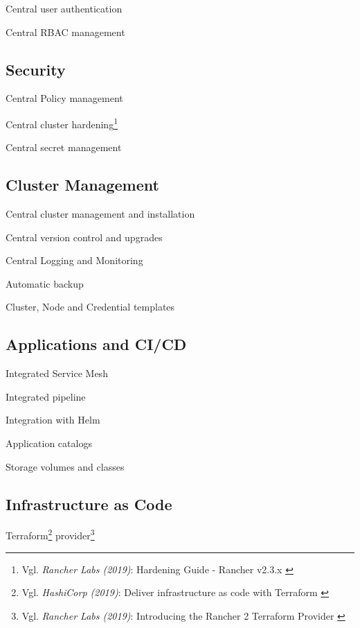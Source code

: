 Central user authentication

Central RBAC management

\subsection{Security}

Central Policy management

Central cluster hardening\footnote{Vgl. \textit{Rancher Labs (2019)}: Hardening Guide - Rancher v2.3.x \cite{hardeningGuide}}

Central secret management

\subsection{Cluster Management}

Central cluster management and installation

Central version control and upgrades

Central Logging and Monitoring

Automatic backup 

Cluster, Node and Credential templates

\subsection{Applications and CI/CD}

Integrated Service Mesh

Integrated pipeline

Integration with Helm

Application catalogs

Storage volumes and classes

\subsection{Infrastructure as Code}

Terraform\footnote{Vgl. \textit{HashiCorp (2019)}: Deliver infrastructure as code with Terraform \cite{terraform}} provider\footnote{Vgl. \textit{Rancher Labs (2019)}: Introducing the Rancher 2 Terraform Provider \cite{terraformProvider}}
